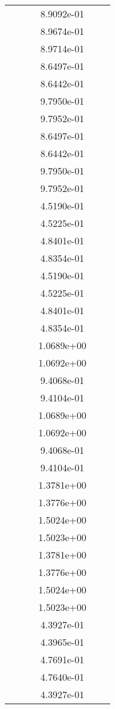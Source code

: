 \begin{xltabular}{\textwidth}{r|rS[table-format=1.3e+2]S[table-format=1.4e+2]S[table-format=1.4e+2]S[table-format=-1.5]}
&  &  & 8.9092e-01 & & \\
&  &  & 8.9674e-01 & & \\
&  &  & 8.9714e-01 & & \\
&  &  & 8.6497e-01 & & \\
&  &  & 8.6442e-01 & & \\
&  &  & 9.7950e-01 & & \\
&  &  & 9.7952e-01 & & \\
&  &  & 8.6497e-01 & & \\
&  &  & 8.6442e-01 & & \\
&  &  & 9.7950e-01 & & \\
&  &  & 9.7952e-01 & & \\
&  &  & 4.5190e-01 & & \\
&  &  & 4.5225e-01 & & \\
&  &  & 4.8401e-01 & & \\
&  &  & 4.8354e-01 & & \\
&  &  & 4.5190e-01 & & \\
&  &  & 4.5225e-01 & & \\
&  &  & 4.8401e-01 & & \\
&  &  & 4.8354e-01 & & \\
&  &  & 1.0689e+00 & & \\
&  &  & 1.0692e+00 & & \\
&  &  & 9.4068e-01 & & \\
&  &  & 9.4104e-01 & & \\
&  &  & 1.0689e+00 & & \\
&  &  & 1.0692e+00 & & \\
&  &  & 9.4068e-01 & & \\
&  &  & 9.4104e-01 & & \\
&  &  & 1.3781e+00 & & \\
&  &  & 1.3776e+00 & & \\
&  &  & 1.5024e+00 & & \\
&  &  & 1.5023e+00 & & \\
&  &  & 1.3781e+00 & & \\
&  &  & 1.3776e+00 & & \\
&  &  & 1.5024e+00 & & \\
&  &  & 1.5023e+00 & & \\
&  &  & 4.3927e-01 & & \\
&  &  & 4.3965e-01 & & \\
&  &  & 4.7691e-01 & & \\
&  &  & 4.7640e-01 & & \\
&  &  & 4.3927e-01 & & \\

\end{xltabular}
